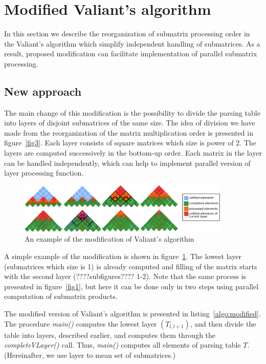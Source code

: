 \section{Modified Valiant's algorithm}

In this section we describe the reorganization of submatrix processing order in the Valiant's algorithm which simplify independent handling of submatrices. As a result, proposed modification can facilitate implementation of parallel submatrix processing.

\subsection{New approach}

The main change of this modification is the possibility to divide the parsing table into layers of disjoint submatrices of the same size.
The idea of division we have made from the reorganization of the matrix multiplication order is presented in figure~\ref{fig3}.
Each layer consists of square matrices which size is power of 2.
The layers are computed successively in the bottom-up order.
Each matrix in the layer can be handled independently, which can help to implement parallel version of layer processing function.

\begin{figure}
    \centering
    \includegraphics[width=0.9\textwidth]{pictures/modivis2.pdf}
    \caption{An example of the modification of Valiant's algorithm}
    \label{fig4}
\end{figure}

A simple example of the modification is shown in figure~\ref{fig4}. 
The lowest layer (submatrices which size is 1) is already computed and filling of the matrix starts with the second layer (????subfigures???? 1-2). 
Note that the same  process is presented in figure~\ref{fig1}, but here it can be done only in two steps using parallel computation of submatrix products.

The modified version of Valiant's algorithm is presented in listing~\ref{algo:modified}.
The procedure \textit{main()} computes the lowest layer $(T_{l, l+1})$, and then divide the table into layers, described earlier, and computes them through the \textit{completeVLayer()} call.
Thus, \textit{main()} computes all elements of parsing table $T$.
(Hereinafter, we use layer to mean set of submatrices.)

